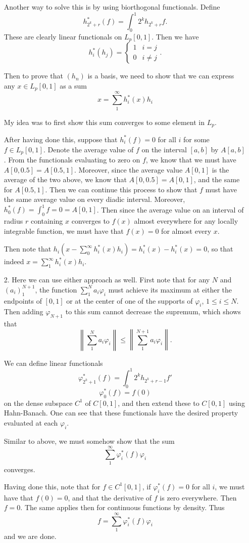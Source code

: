 \documentclass[11pt, reqno]{article}
\theoremstyle{plain}
\theoremstyle{definition}
\theoremstyle{remark}
\renewcommand{\phi}{\varphi}
\begin{document}
\begin{enumerate}
    Another way to solve this is by using biorthogonal functionals. Define
    \[
        h_{2^k + r}^*(f) = \int_0^1 2^k h_{2^k + r}f.
    \]
    These are clearly linear functionals on $L_p[0,1]$. Then we have 
    \[  
        h_i^*(h_j) = \begin{cases} 1 & i = j \\ 0 & i \neq j\end{cases}.
    \]

    Then to prove that $(h_n)$ is a basis, we need to show that we can express any $x \in L_p[0,1]$ as a sum
    \[
        x = \sum_1^\infty h_i^*(x) h_i
    \]

    My idea was to first show this sum converges to some element in $L_p$. 
    
    After having done this, suppose that $h_i^*(f) = 0$ for all $i$ for some $f \in L_p[0,1]$.
    Denote the average value of $f$ on the interval $[a,b]$ by $A[a,b]$. From the functionals evaluating 
    to zero on $f$, we know that we must have $A[0,0.5] = A[0.5, 1]$. Moreover, since the average 
    value $A[0,1]$ is the average of the two above, we know that $A[0,0.5] = A[0,1]$, and the same for $A[0.5, 1]$. 
    Then we can continue this process to show that $f$ must have the same average value on every diadic interval.
    Moreover, $h_0^*(f) = \int_0^1 f = 0 = A[0,1]$. Then since the average value on an interval of radius $r$ 
    containing $x$ converges to $f(x)$ almost everywhere for any locally integrable function, we must have 
    that $f(x) = 0$ for almost every $x$. 

    Then note that $h_i(x - \sum_0^\infty h_i^*(x)h_i) = h_i^*(x) - h_i^*(x) = 0$, so that indeed
    $x = \sum_1^\infty h_i^*(x) h_i$.

    \item[2.] Here we can use either approach as well. First note that for any $N$ and $(a_i)_1^{N+1}$, 
    the function $\sum_1^N a_i \phi_i$ must achieve its maximum at either the endpoints of $[0,1]$
    or at the center of one of the supports of $\phi_i$, $1 \leq i \leq N$. Then adding $\phi_{N+1}$
    to this sum cannot decrease the supremum, which shows that 
    \[
        \left\|\sum_1^N a_i \phi_i \right\| \leq \left\|\sum_1^{N+1} a_i \phi_i\right\|.
    \]

    We can define linear functionals 
    \[
        \phi_{2^k + 1}^*(f) = \int_0^1 2^k h_{2^k + r - 1} f'
    \]
    \[
        \phi_0^*(f) = f(0)
    \]
    on the dense subspace $C^1$ of $C[0,1]$, and then extend these to $C[0,1]$ using Hahn-Banach. One can see that 
    these functionals have the desired property evaluated at each $\phi_i$. 
    
    Similar to above,
    we must somehow show that the sum 
    \[
        \sum_1^\infty \phi_i^*(f) \phi_i
    \]
    converges.

    Having done this, note that for $f \in C^1[0,1]$, if $\phi_i^*(f) = 0$ for all $i$, we must have that $f(0) = 0$, and that 
    the derivative of $f$ is zero everywhere. Then $f = 0$. The same applies then for continuous functions by density.
    Thus 
    \[
        f = \sum_1^\infty \phi_i^*(f) \phi_i
    \]
    and we are done. 
\end{enumerate}
\end{document}
